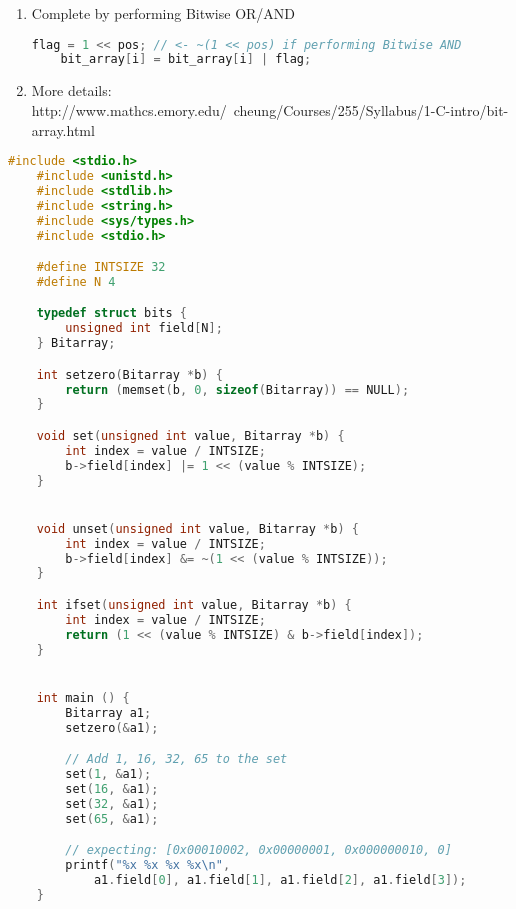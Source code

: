 \documentclass[12pt]{article}
\begin{document}
\begin{itemize}
\begin{itemize}
\begin{enumerate}[1.]
            \item Complete by performing Bitwise OR/AND

    \begin{lstlisting}[language=c]
    flag = 1 << pos; // <- ~(1 << pos) if performing Bitwise AND
    bit_array[i] = bit_array[i] | flag;
    \end{lstlisting}

        \item More details: http://www.mathcs.emory.edu/~cheung/Courses/255/Syllabus/1-C-intro/bit-array.html
        \end{enumerate}
    \end{itemize}

    \begin{lstlisting}[language=c,caption={bit\_manipulation\_example\_4.c}]
    #include <stdio.h>
    #include <unistd.h>
    #include <stdlib.h>
    #include <string.h>
    #include <sys/types.h>
    #include <stdio.h>

    #define INTSIZE 32
    #define N 4

    typedef struct bits {
        unsigned int field[N];
    } Bitarray;

    int setzero(Bitarray *b) {
        return (memset(b, 0, sizeof(Bitarray)) == NULL);
    }

    void set(unsigned int value, Bitarray *b) {
        int index = value / INTSIZE;
        b->field[index] |= 1 << (value % INTSIZE);
    }


    void unset(unsigned int value, Bitarray *b) {
        int index = value / INTSIZE;
        b->field[index] &= ~(1 << (value % INTSIZE));
    }

    int ifset(unsigned int value, Bitarray *b) {
        int index = value / INTSIZE;
        return (1 << (value % INTSIZE) & b->field[index]);
    }


    int main () {
        Bitarray a1;
        setzero(&a1);

        // Add 1, 16, 32, 65 to the set
        set(1, &a1);
        set(16, &a1);
        set(32, &a1);
        set(65, &a1);

        // expecting: [0x00010002, 0x00000001, 0x000000010, 0]
        printf("%x %x %x %x\n",
            a1.field[0], a1.field[1], a1.field[2], a1.field[3]);
    }

    \end{lstlisting}

\end{itemize}
\end{document}
